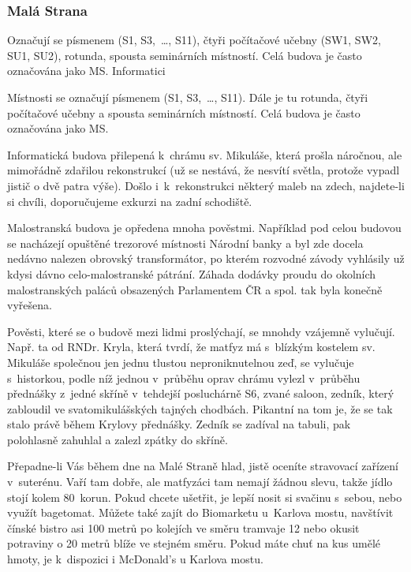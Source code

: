\subsubsection{Malá Strana}

 {Označují se
písmenem  (S1, S3,~\dots, S11), čtyři počítačové učebny (SW1, SW2, SU1, SU2), rotunda, spousta seminárních
místností. Celá budova je často označována jako MS.} {Informatici}


Místnosti se označují písmenem
  (S1, S3,~\dots, S11). Dále je tu rotunda, čtyři počítačové učebny a spousta seminárních
 místností. Celá budova je často označována jako MS.

Informatická budova přilepená k~chrámu sv. Mikuláše, která prošla
náročnou, ale mimořádně zdařilou rekonstrukcí (už se nestává, že
nesvítí světla, protože vypadl jistič o dvě patra výše). Došlo
i~k~rekonstrukci některý maleb na zdech, najdete-li si chvíli,
doporučujeme exkurzi na zadní schodiště.

Malostranská budova je opředena mnoha pověstmi. Například pod
celou budovou se nacházejí opuštěné trezorové místnosti Národní
banky a byl zde docela nedávno nalezen obrovský transformátor, po
kterém rozvodné závody vyhlásily už kdysi dávno celo-malostranské
pátrání. Záhada dodávky proudu do okolních malostranských paláců
obsazených Parlamentem ČR a spol. tak byla konečně vyřešena.

Pověsti, které se o budově mezi lidmi proslýchají, se mnohdy
vzájemně vylučují. Např. ta od RNDr. Kryla, která tvrdí, že matfyz
má s~blízkým kostelem sv. Mikuláše společnou jen jednu tlustou
neproniknutelnou zeď, se vylučuje s~historkou, podle níž jednou
v~průběhu oprav chrámu vylezl v~průběhu přednášky z~jedné skříně
v~tehdejší posluchárně S6, zvané saloon, zedník, který zabloudil
ve svatomikulášských tajných chodbách. Pikantní na tom je, že se
tak stalo právě během Krylovy přednášky. Zedník se zadíval na
tabuli, pak polohlasně zahuhlal  a zalezl zpátky do
skříně.

Přepadne-li Vás během dne na Malé Straně hlad, jistě oceníte
stravovací zařízení  v~suterénu. Vaří tam dobře,
ale matfyzáci tam nemají žádnou slevu, takže jídlo stojí kolem
80~korun. Pokud chcete ušetřit, je lepší nosit si svačinu
s~sebou, nebo využít bagetomat. Můžete také zajít do Biomarketu
u~Karlova mostu, navštívit čínské bistro asi 100 metrů po kolejích
ve směru tramvaje 12 nebo okusit potraviny o 20 metrů blíže ve
stejném směru. Pokud máte chuť na kus umělé hmoty, je k~dispozici i McDonald's u Karlova mostu.

